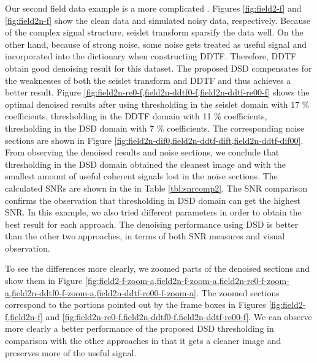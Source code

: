 Our second field data example is a more complicated . Figures \ref{fig:field2-f} and \ref{fig:field2n-f} show the clean data and simulated noisy data, respectively.  Because of the complex signal structure, seislet transform  sparsify the data well. %
On the other hand, because of strong noise, some noise gets treated as useful signal and  incorporated into the dictionary when constructing DDTF. Therefore, DDTF  obtain good denoising result for this dataset.  The proposed DSD compensates for the weaknesses of both the seislet transform and DDTF and thus achieves a better result. Figure \ref{fig:field2n-re0-f,field2n-ddtf0-f,field2n-ddtf-re00-f} shows the optimal denoised results after using thresholding in the seislet domain with 17 \% coefficients, thresholding in the DDTF domain with 11 \% coefficients, thresholding in the DSD domain with 7 \% coefficients. The corresponding noise sections are shown in Figure \ref{fig:field2n-dif0,field2n-ddtf-dift,field2n-ddtf-dif00}. From observing the denoised results and noise sections, we conclude that thresholding in the DSD domain obtained the cleanest image and with the smallest amount of useful coherent signals lost in the noise sections. The calculated SNRs are shown in the  in Table \ref{tbl:snrcomp2}. The SNR comparison confirms the observation that thresholding in DSD domain can get the highest SNR. In this example, we also tried different parameters in order to obtain the best result for each approach. The denoising performance using DSD is  better than the other two approaches, in terms of both SNR measures and visual observation. %

To see the differences more clearly, we zoomed parts of the denoised sections and show them in Figure \ref{fig:field2-f-zoom-a,field2n-f-zoom-a,field2n-re0-f-zoom-a,field2n-ddtf0-f-zoom-a,field2n-ddtf-re00-f-zoom-a}. The zoomed sections correspond to the portions pointed out by the frame boxes in Figures \ref{fig:field2-f,field2n-f} and \ref{fig:field2n-re0-f,field2n-ddtf0-f,field2n-ddtf-re00-f}. We can observe more clearly a better performance of the proposed DSD thresholding in comparison with the other  approaches in that it gets a cleaner image and preserves more of the useful signal. %

